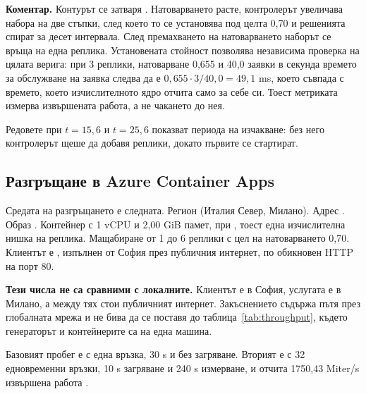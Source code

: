 \textbf{Коментар.} Контурът се затваря . Натоварването расте, контролерът
увеличава набора на две стъпки, след което то се установява под целта 0{,}70 и решенията спират за
десет интервала. След премахването на натоварването наборът се връща на една реплика. Установената стойност позволява независима проверка на цялата верига: при 3
реплики, натоварване 0{,}655 и 40{,}0 заявки в секунда времето за обслужване на заявка следва да е
$0{,}655 \cdot 3 / 40{,}0 = 49{,}1$ ms, което съвпада с времето, което изчислителното ядро отчита
само за себе си. Тоест метриката измерва извършената работа, а не чакането до нея.

Редовете при $t = 15{,}6$ и $t = 25{,}6$ показват периода на изчакване: без него контролерът щеше
да добавя реплики, докато първите се стартират.

\subsection{Разгръщане в Azure Container Apps}
\label{sec:azure-run}

Средата на разгръщането е следната. Регион  (Италия Север, Милано). Адрес
. Образ
. Контейнер с 1 vCPU и 2{,}00 GiB памет, при
, тоест една изчислителна нишка на реплика. Мащабиране от 1 до 6 реплики с цел на натоварването 0{,}70. Клиентът е
, изпълнен от София през публичния интернет, по обикновен HTTP на порт 80.

\textbf{Тези числа не са сравними с локалните.} Клиентът е в София, услугата е в Милано, а между
тях стои публичният интернет. Закъснението съдържа пътя през глобалната мрежа и не бива да се
поставя до таблица~\ref{tab:throughput}, където генераторът и контейнерите са на една машина.

Базовият пробег е с една връзка, 30 s и без загряване. Вторият е с 32 едновременни връзки, 10 s
загряване и 240 s измерване, и отчита 1750{,}43 Miter/s извършена работа .

